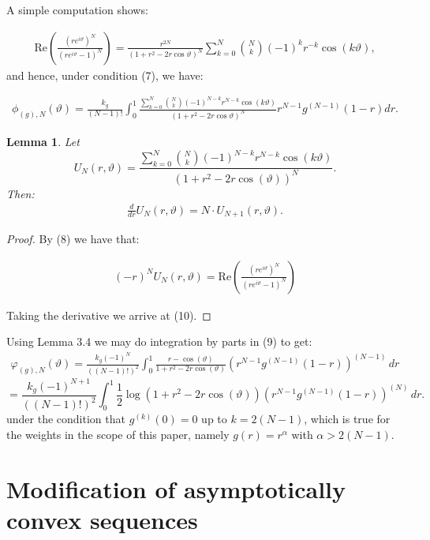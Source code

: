 \documentclass{amsart}[11pt]
\newcommand{\vth}{\vartheta}
\newtheorem{lemma}[theorem]{Lemma}
\theoremstyle{definition}
\begin{document}
A simple computation shows:

\begin{gather}
\text{Re} \left( \frac{(r e^{i\vth})^N}{(r e^{i\vth} - 1)^N} \right)
= \frac{r^{2N}}{(1 + r^2 - 2r \cos\vth)^N} \sum_{k=0}^{N} \binom{N}{k} (-1)^k r^{-k} \cos(k\vth),
\end{gather}
and hence, under condition (7), we have:

\begin{gather}
\phi_{(g),N} (\vth) =
\frac{k_g}{(N-1)!} \int_{0}^{1} \frac{ \sum_{k=0}^{N} \binom{N}{k} (-1)^{N-k} r^{N-k} \cos(k\vth)}{(1 + r^2 - 2r \cos\vth)^N} r^{N-1} g^{(N-1)}(1 - r) dr.
\end{gather}

\begin{lemma}
Let 
\[
U_N(r,\vartheta) = \frac{\sum_{k=0}^{N} \binom{N}{k} (-1)^{N-k} r^{N-k} \cos(k\vartheta)}{(1 + r^2 - 2r \cos(\vartheta))^N}.
\]
Then:
\begin{gather}
\frac{d}{dr} U_N(r,\vartheta) = N \cdot U_{N+1}(r,\vartheta).
\end{gather}
\end{lemma}

\begin{proof}
By (8) we have that: 

\begin{gather*}
    (-r)^N U_N(r, \vth) = \text{Re}\left( \frac{(r e^{i\vth})^N}{(r e^{i\vth} - 1)^N} \right)
\end{gather*}

Taking the derivative we arrive at (10).
\end{proof}

Using Lemma 3.4 we may do integration by parts in (9) to get:
\begin{gather}
\varphi_{(g),N}(\vartheta) = \frac{k_g (-1)^N}{((N-1)!)^2} \int_0^1 \frac{r - \cos(\vartheta)}{1 + r^2 - 2r \cos(\vartheta)} \left( r^{N-1} g^{(N-1)}(1 - r) \right)^{(N-1)} \, dr
\end{gather}
\[
= \frac{k_g (-1)^{N+1}}{((N-1)!)^2} \int_0^1 \frac{1}{2}\log(1 + r^2 - 2r \cos(\vartheta)) \left( r^{N-1} g^{(N-1)}(1 - r) \right)^{(N)} \, dr.
\]
under the condition that $g^{(k)}(0) = 0$ up to $k = 2(N-1)$, which is true for the weights in the scope of this paper, namely $g(r) = r^\alpha$ with $\alpha > 2(N-1)$.

\section{Modification of asymptotically convex sequences}
\end{document}

